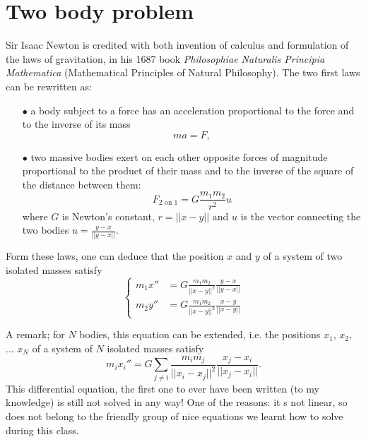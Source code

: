 \section{Two body problem}

Sir Isaac Newton is credited with both invention of calculus and formulation of the laws of gravitation, in his 1687 book \textit{Philosophiae Naturalis Principia Mathematica} (Mathematical Principles of Natural Philosophy). The two first laws can be rewritten as:
\begin{itemize}
\item[$\bullet$] a body subject to a force has an acceleration proportional to the force and to the inverse of its mass
\[ma = F, \]
\item[$\bullet$] two massive bodies exert on each other opposite forces of magnitude proportional to the product of their mass and to the inverse of the square of the distance between them:
\[F_{\text{2 on 1}} = G\frac{m_1 m_2}{r^2}u\]
where $G$ is Newton's constant, $r = ||x-y||$ and $u$ is the vector connecting the two bodies $u = \frac{y-x}{||y-x||}$. 
\end{itemize}

Form these laws, one can deduce that the position $x$ and $y$ of a system of two isolated masses satisfy
\[\left\{\begin{split}
m_1 x'' & = G\frac{m_1 m_2}{||x-y||^2}\frac{y-x}{||y-x||} \\ 
m_2 y'' & = G\frac{m_1 m_2}{||x-y||^2}\frac{x-y}{||x-y||} 
\end{split}\right.\]

A remark; for $N$ bodies, this equation can be extended, i.e. the positions $x_1$, $x_2$, ... $x_N$ of a system of $N$ isolated masses satisfy
\[m_i x_i''  = G\sum_{j \neq i}\frac{m_i m_j}{||x_i-x_j||^2}\frac{x_j-x_i}{||x_j-x_i||}.  \]
This differential equation, the first one to ever have been written (to my knowledge) is still not solved in any way! One of the reasons: it s not linear, so does not belong to the friendly group of nice equations we learnt how to solve during this class.\\

